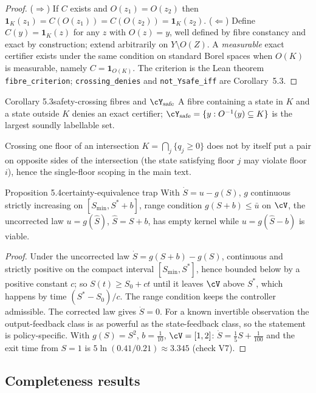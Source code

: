 \begin{proof}
($\Rightarrow$) If $C$ exists and $O(z_1)=O(z_2)$ then $\mathbf 1_K(z_1)=C(O(z_1))=C(O(z_2))=\mathbf 1_K(z_2)$. ($\Leftarrow$) Define $C(y)=\mathbf 1_K(z)$ for any $z$ with $O(z)=y$, well defined by fibre constancy and exact by construction; extend arbitrarily on $Y\setminus O(Z)$. A \emph{measurable} exact certifier exists under the same condition on standard Borel spaces when $O(K)$ is measurable, namely $C=\mathbf 1_{O(K)}$. The criterion is the Lean theorem \texttt{fibre\_criterion}; \texttt{crossing\_denies} and \texttt{not\_Ysafe\_iff} are Corollary~5.3.
\end{proof}

\begin{restated}{Corollary 5.3}{safety-crossing fibres and $\cY_{\mathrm{safe}}$}
A fibre containing a state in $K$ and a state outside $K$ denies an exact certifier; $\cY_{\mathrm{safe}}=\{y:O^{-1}(y)\subseteq K\}$ is the largest soundly labellable set.
\end{restated}

Crossing one floor of an intersection $K=\bigcap_j\{q_j\ge0\}$ does not by itself put a pair on opposite sides of the intersection (the state satisfying floor $j$ may violate floor $i$), hence the single-floor scoping in the main text.

\begin{restated}{Proposition 5.4}{certainty-equivalence trap}
With $\dot S=u-g(S)$, $g$ continuous strictly increasing on $[S_{\min},S^*+b]$, range condition $g(S+b)\le\bar u$ on $\cV$, the uncorrected law $u=g(\hat S)$, $\hat S=S+b$, has empty kernel while $u=g(\hat S-b)$ is viable.
\end{restated}

\begin{proof}
Under the uncorrected law $\dot S=g(S+b)-g(S)$, continuous and strictly positive on the compact interval $[S_{\min},S^*]$, hence bounded below by a positive constant $c$; so $S(t)\ge S_0+ct$ until it leaves $\cV$ above $S^*$, which happens by time $(S^*-S_0)/c$. The range condition keeps the controller admissible. The corrected law gives $\dot S=0$. For a known invertible observation the output-feedback class is as powerful as the state-feedback class, so the statement is policy-specific. With $g(S)=S^2$, $b=\tfrac1{10}$, $\cV=[1,2]$: $\dot S=\tfrac15S+\tfrac1{100}$ and the exit time from $S=1$ is $5\ln(0.41/0.21)\approx3.345$ (check V7).
\end{proof}

\subsection{Completeness results}\label{S:completeness}

